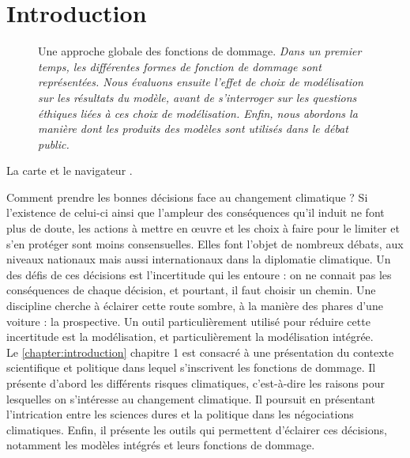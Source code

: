 \chapter*{Introduction}

\begin{figure}
    \centering
    \caption{Une approche globale des fonctions de dommage. \textit{Dans un premier temps, les différentes formes de fonction de dommage sont représentées. Nous évaluons ensuite l'effet de choix de modélisation sur les résultats du modèle, avant de s'interroger sur les questions éthiques liées à ces choix de modélisation. Enfin, nous abordons la manière dont les produits des modèles sont utilisés dans le débat public.}}
    \label{fig:enter-label}
\end{figure}


La carte et le navigateur \cite{edenhofer_mapmakers_2014}. 

Comment prendre les bonnes décisions face au changement climatique ? Si l'existence de celui-ci ainsi que l'ampleur des conséquences qu'il induit ne font plus de doute, les actions à mettre en œuvre et les choix à faire pour le limiter et s'en protéger sont moins consensuelles. Elles font l'objet de nombreux débats, aux niveaux nationaux mais aussi internationaux dans la diplomatie climatique. Un des défis de ces décisions est l'incertitude qui les entoure : on ne connait pas les conséquences de chaque décision, et pourtant, il faut choisir un chemin. Une discipline cherche à éclairer cette route sombre, à la manière des phares d'une voiture : la prospective. Un outil particulièrement utilisé pour réduire cette incertitude est la modélisation, et particulièrement la modélisation intégrée. \\





Le \ref{chapter:introduction} chapitre 1 est consacré à une présentation du contexte scientifique et politique dans lequel s'inscrivent les fonctions de dommage. Il présente d'abord les différents risques climatiques, c'est-à-dire les raisons pour lesquelles on s'intéresse au changement climatique. Il poursuit en présentant l'intrication entre les sciences dures et la politique dans les négociations climatiques. Enfin, il présente les outils qui permettent d'éclairer ces décisions, notamment les modèles intégrés et leurs fonctions de dommage. 


